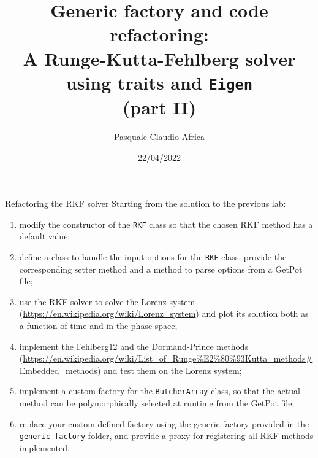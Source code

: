 \documentclass[10pt]{beamer}
\begin{document}
\title{Generic factory and code refactoring:\protect\\A Runge-Kutta-Fehlberg solver\protect\\using traits and \texttt{Eigen}\protect\\(part II)}
    \author{Pasquale Claudio Africa}
    \date{22/04/2022}

\begin{frame}
    \maketitle
\end{frame}

\begin{frame}{Refactoring the RKF solver}
Starting from the solution to the previous lab:
\begin{enumerate}
\item modify the constructor of the \texttt{RKF} class so that the chosen RKF method has a default value;
\item define a class to handle the input options for the \texttt{RKF} class, provide the corresponding setter method and a method to parse options from a GetPot file;
\item use the RKF solver to solve the Lorenz system (\url{https://en.wikipedia.org/wiki/Lorenz_system}) and plot its solution both as a function of time and in the phase space;
\item implement the Fehlberg12 and the Dormand-Prince methods (\url{https://en.wikipedia.org/wiki/List_of_Runge\%E2\%80\%93Kutta_methods\#Embedded_methods}) and test them on the Lorenz system;
\item implement a custom factory for the \texttt{ButcherArray} class, so that the actual method can be polymorphically selected at runtime from the GetPot file;
\item replace your custom-defined factory using the generic factory provided in the \texttt{generic-factory} folder, and provide a proxy for registering all RKF methods implemented.
\end{enumerate}
\end{frame}
\end{document}
